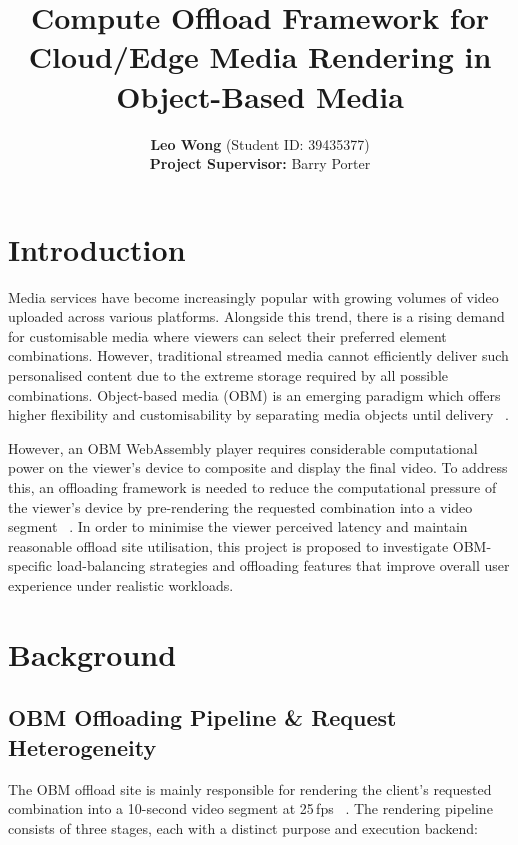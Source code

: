 \documentclass[11pt,a4paper]{article}
\title{\textbf{Compute Offload Framework for Cloud/Edge Media Rendering in Object-Based Media}}
\author{\textbf{Leo Wong} \quad (Student ID: 39435377) \\[0.2em] \small \textbf{Project Supervisor:} Barry Porter}
\date{}
\begin{document}
\maketitle

\section{Introduction}
\label{sec:Introduction}

Media services have become increasingly popular with growing volumes of video uploaded across various platforms.
Alongside this trend, there is a rising demand for customisable media where viewers can select their preferred element combinations.
However, traditional streamed media cannot efficiently deliver such personalised content due to the extreme storage required by all possible combinations.
Object-based media (OBM) is an emerging paradigm which offers higher flexibility and customisability by separating media objects until delivery ~\cite{doi:10.1049/ib.2014.0038}.

However, an OBM WebAssembly player requires considerable computational power on the viewer's device to composite and display the final video. 
To address this, an offloading framework is needed to reduce the computational pressure of the viewer's device by pre-rendering the requested combination into a video segment ~\cite{10.1145/3793853.3795762}.
In order to minimise the viewer perceived latency and maintain reasonable offload site utilisation,
this project is proposed to investigate OBM-specific load-balancing strategies and offloading features that improve overall user experience under realistic workloads.

\section{Background}
\label{sec:Background}

\subsection{OBM Offloading Pipeline \& Request Heterogeneity}

The OBM offload site is mainly responsible for rendering the client's requested combination into a 10-second video segment at 25\,fps ~\cite{10.1145/3793853.3795762}.
The rendering pipeline consists of three stages, each with a distinct purpose and execution backend:
\end{document}
